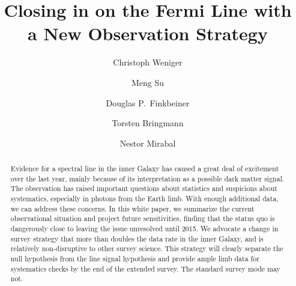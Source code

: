 \documentclass[aps,prd,superscriptaddress,nofootinbib,fixlfloat, 12pt]{revtex4-1}
\begin{document}
\title{Closing in on the Fermi Line with a New Observation Strategy}

\author{Christoph Weniger}

\author{Meng Su}

\author{Douglas P.~Finkbeiner}

\author{Torsten Bringmann}

\author{Nestor Mirabal}

\begin{abstract}
  Evidence for a spectral line in the inner Galaxy has caused a great deal of
  excitement over the last year, mainly because of its interpretation as a
  possible dark matter signal.  The observation has raised important questions
  about statistics and suspicions about systematics, especially in photons
  from the Earth limb.  With enough additional data, we can address these
  concerns.  In this white paper, we summarize the current
  observational situation and project future sensitivities, finding that the
  status quo is dangerously close to leaving the issue unresolved until 2015.  We
  advocate a change in survey strategy that more than doubles the data rate in
  the inner Galaxy, and is relatively non-disruptive to other survey science.  
  This strategy will clearly separate the null hypothesis from the line signal
  hypothesis and provide ample limb data for systematics checks by the end of
  the extended survey.  The standard survey mode may not. 

\end{abstract}
\end{document}
